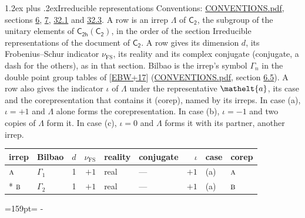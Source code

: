 \documentclass[10pt,a4paper]{article}
\makeatletter
\renewcommand\section{\@startsection{section}{1}{\z@}{-3ex plus -1ex minus -.2ex}%
  {1.2ex plus .2ex}{\normalfont\large\sffamily\bfseries\color{parttitle}}}
\newcommand{\needspace}[1]{\par\penalty-100\begingroup\dimen0=#1\relax\dimen2=\pagegoal
  \advance\dimen2-\pagetotal\ifdim\dimen0>\dimen2\relax\ifdim\dimen2>0pt\vfil\break\fi\fi
  \endgroup}
\numberwithin{equation}{section}
\newcommand{\eltfont}[1]{{\let\sigma\eltsigma\mathelt{#1}}}
\newcommand{\grp}[1]{\mathsf{#1}}
\newcommand{\irr}[1]{\text{\normalfont\scshape #1}}
\newcommand{\elt}[1]{\eltfont{#1}}
\newcommand{\fsind}{\nu_{\mathrm{FS}}}
\makeatother
\begin{document}
\section{Irreducible representations}\label{s:irreps}
Conventions: \href{../../CONVENTIONS.pdf}{CONVENTIONS.pdf}, sections \href{../../../rotation/CONVENTIONS.pdf\#conv.6}{6}, \href{../../../rotation/CONVENTIONS.pdf\#conv.7}{7}, \href{../../CONVENTIONS.pdf\#conv.32.1}{32.1} and \href{../../CONVENTIONS.pdf\#conv.32.3}{32.3}.
\leavevmode\label{n:irrep.Delta}A row is an irrep $\Lambda$ of $\grp{C_{2}}$, the subgroup of the unitary elements of $\grp{C_{2h}}(\grp{C_{2}})$, in the order of the section Irreducible representations of the document of \href{../../../rotation/data/pdf/C2.pdf}{$\grp{C_{2}}$}. \label{n:index.dimension}\label{n:index.frobenius}\label{n:head.irrep}\label{n:head.reality}\label{n:head.conjugate}A row gives its dimension $d$, its Frobenius--Schur indicator $\fsind$, its reality and its complex conjugate (conjugate, a dash for the others), as in that section. \label{n:head.bilbao}\label{n:irrep.alias.gamma}Bilbao is the irrep's symbol $\Gamma_n$ in the double point group tables of [\href{../../../REFERENCES.pdf\#ref.EBW+17}{EBW+17}] (\href{../../CONVENTIONS.pdf}{CONVENTIONS.pdf}, section \href{../../../rotation/CONVENTIONS.pdf\#conv.6.5}{6.5}). \label{n:head.case.corep}\label{n:head.corep}A row also gives the indicator $\iota$ of $\Lambda$ under the representative $\elt{a}$, its case and the corepresentation that contains it (corep), named by its irreps. In case (a), $\iota = +1$ and $\Lambda$ alone forms the corepresentation. In case (b), $\iota = -1$ and two copies of $\Lambda$ form it. In case (c), $\iota = 0$ and $\Lambda$ forms it with its partner, another irrep.
\setlength{\emergencystretch}{2em}\par\setlength{\emergencystretch}{0pt}
{\small\renewcommand{\arraystretch}{1.25}\setlength{\tabcolsep}{4pt}\begin{longtable}{@{}llrrllrll@{}}\toprule
irrep & Bilbao & $d$ & $\fsind$ & reality & conjugate & $\iota$ & case & corep\\\midrule\endhead
\bottomrule\endfoot\endlastfoot
$\irr{a}$ & $\Gamma_{1}$ & 1 & $+1$ & real & --- & $+1$ & (a) & $\irr{a}$\\*
$\irr{b}$ & $\Gamma_{2}$ & 1 & $+1$ & real & --- & $+1$ & (a) & $\irr{b}$\\
\bottomrule\end{longtable}}
\needspace{159pt}
\end{document}
